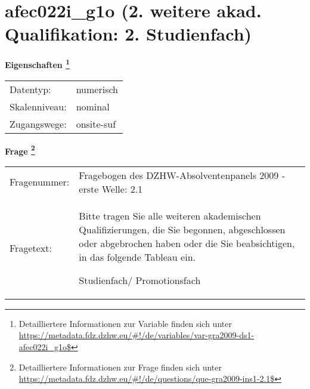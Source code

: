 
    \setcounter{footnote}{0}

    \vspace*{-1.8cm}
	\section{afec022i\_g1o (2. weitere akad. Qualifikation: 2. Studienfach)}
	\label{section:afec022i_g1o}



    \vspace*{0.5cm}
    \noindent\textbf{Eigenschaften
	\footnote{Detailliertere Informationen zur Variable finden sich unter
		\url{https://metadata.fdz.dzhw.eu/\#!/de/variables/var-gra2009-ds1-afec022i_g1o$}}}\\
	\begin{tabularx}{\hsize}{@{}lX}
	Datentyp: & numerisch \\
	Skalenniveau: & nominal \\
	Zugangswege: &
	  onsite-suf
 \\
    \end{tabularx}



				\vspace*{0.5cm}
                \noindent\textbf{Frage
	                \footnote{Detailliertere Informationen zur Frage finden sich unter
		              \url{https://metadata.fdz.dzhw.eu/\#!/de/questions/que-gra2009-ins1-2.1$}}}\\
				\begin{tabularx}{\hsize}{@{}lX}
					Fragenummer: &
					  Fragebogen des DZHW-Absolventenpanels 2009 - erste Welle:
					  2.1
 \\
					Fragetext: & Bitte tragen Sie alle weiteren akademischen Qualifizierungen, die Sie begonnen, abgeschlossen oder abgebrochen haben oder die Sie beabsichtigen, in das folgende Tableau ein.\par  Studienfach/ Promotionsfach \\
				\end{tabularx}





